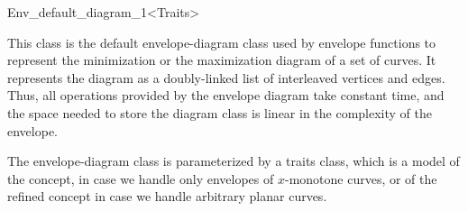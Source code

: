 
\ccRefPageBegin

\begin{ccRefClass}{Env_default_diagram_1<Traits>}

\ccDefinition

This class is the default envelope-diagram class used by envelope functions
to represent the minimization or the maximization diagram of a set of curves. 
It represents the diagram as a doubly-linked list of interleaved vertices
and edges. Thus, all operations provided by the envelope diagram take constant
time, and the space needed to store the diagram class is linear in the
complexity of the envelope.

The envelope-diagram class is parameterized by a traits class, which is a
model of the  concept, in case we handle
only envelopes of $x$-monotone curves, or of the refined
 concept in case we handle arbitrary planar curves.


\ccIsModel

\end{ccRefClass}

\ccRefPageEnd
